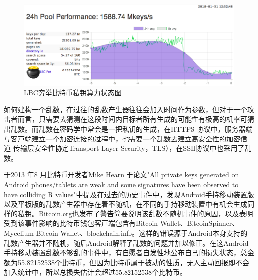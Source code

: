 				\begin{figure}[!htbp]
					\centering
					\includegraphics[width = .9\textwidth]{LBC.png}
					\caption{LBC穷举比特币私钥算力状态图\supercite{TheLargeBitcoinCollider}}\label{LBC}
				\end{figure}

				如何建构一个乱数，在过往的乱数产生器往往会加入时间作为参数，但对于一个攻击者而言，只需要去猜测在这段时间内目标者所有生成的可能性有极高的机率可猜出乱数。而乱数在密码学中常会是一把私钥的生成，在HTTPS 协议中，服务器端与客⼾端建⽴⼀个加密连接的过程中，也需要⼀个乱数去建⽴⾼安全性的加密信道-传输层安全性协定Transport Layer Security，TLS）\supercite{dierks2008transport}，在SSH协议\supercite{ThesecureshellSSHprotocolarchitecture}中也采用了乱数。
		
				于2013 年8 ⽉⽐特币开发者Mike Hearn 于论文"All private keys generated on Android phones/tablets are weak and some signatures have been observed to have colliding R values"\supercite{SomeSecureRandomThoughts}中提及在过去的历史事件中，发现Android手持移动装置版以及平板版的乱数产生器中存在着不随机，在不同的手持移动装置中有机会生成同样的私钥。Bitcoin.org也发布了警告\supercite{AndroidSecurityVulnerability}简要说明该乱数不随机事件的原因，以及表明受到该事件影响的⽐特币钱包客⼾端包含有Bitcoin Wallet、BitcoinSpinner、Mycelium Bitcoin Wallet、blockchain.info。这样的错误源于Android本身支持的乱数产生器并不随机，随后Android解释了乱数的问题并加以修正。在这Android手持移动装置乱数不够乱的事件中，有自愿者自发性地公布自己的损失状态，总金额为55.82152538个比特币\supercite{Badsignaturesleading}，但因为比特币属于被动的性质，无人主动回报即不会加入统计中，所以总损失估计会超过55.82152538个比特币。

